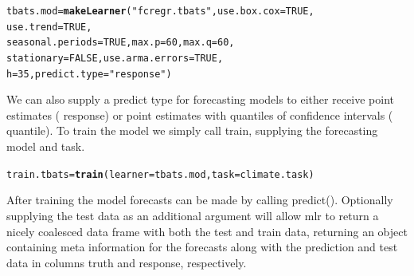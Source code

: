 \documentclass[12pt]{article}\usepackage[]{graphicx}\usepackage[]{color}
\makeatletter
\newcommand{\hlnum}[1]{\textcolor[rgb]{0.686,0.059,0.569}{#1}}%
\newcommand{\hlstr}[1]{\textcolor[rgb]{0.192,0.494,0.8}{#1}}%
\newcommand{\hlstd}[1]{\textcolor[rgb]{0.345,0.345,0.345}{#1}}%
\newcommand{\hlkwb}[1]{\textcolor[rgb]{0.69,0.353,0.396}{#1}}%
\newcommand{\hlkwc}[1]{\textcolor[rgb]{0.333,0.667,0.333}{#1}}%
\newcommand{\hlkwd}[1]{\textcolor[rgb]{0.737,0.353,0.396}{\textbf{#1}}}%
\newenvironment{kframe}{%
 \def\at@end@of@kframe{}%
 \ifinner\ifhmode%
  \def\at@end@of@kframe{\end{minipage}}%
  \begin{minipage}{\columnwidth}%
 \fi\fi%
 \def\FrameCommand##1{\hskip\@totalleftmargin \hskip-\fboxsep
 \colorbox{shadecolor}{##1}\hskip-\fboxsep
     \hskip-\linewidth \hskip-\@totalleftmargin \hskip\columnwidth}%
 \MakeFramed {\advance\hsize-\width
   \@totalleftmargin\z@ \linewidth\hsize
   \@setminipage}}%
 {\par\unskip\endMakeFramed%
 \at@end@of@kframe}
\newenvironment{knitrout}{}{} %
\theoremstyle{definition}
\newcommand\code{\@codex}
\def\@codex#1{{\normalfont\ttfamily\hyphenchar\font=-1 #1}}
\newcommand{\pkg}[1]{{\fontseries{b}\selectfont #1}}
\makeatother
\begin{document}
\singlespacing
\begin{knitrout}
\color{fgcolor}\begin{kframe}
\begin{alltt}
\hlstd{tbats.mod} \hlkwb{=}\hlkwd{makeLearner}\hlstd{(}\hlstr{"fcregr.tbats"}\hlstd{,} \hlkwc{use.box.cox} \hlstd{=} \hlnum{TRUE}\hlstd{,}
                      \hlkwc{use.trend} \hlstd{=} \hlnum{TRUE}\hlstd{,}
                      \hlkwc{seasonal.periods} \hlstd{=} \hlnum{TRUE}\hlstd{,} \hlkwc{max.p} \hlstd{=} \hlnum{60}\hlstd{,} \hlkwc{max.q} \hlstd{=} \hlnum{60}\hlstd{,}
                      \hlkwc{stationary} \hlstd{=} \hlnum{FALSE}\hlstd{,} \hlkwc{use.arma.errors} \hlstd{=} \hlnum{TRUE}\hlstd{,}
                      \hlkwc{h} \hlstd{=} \hlnum{35}\hlstd{,} \hlkwc{predict.type} \hlstd{=} \hlstr{"response"}\hlstd{)}
\end{alltt}
\end{kframe}
\end{knitrout}
\doublespacing

We can also supply a predict type for forecasting models to either receive point estimates (\code{response}) or point estimates with quantiles of confidence intervals (\code{quantile}). To train the model we simply call train, supplying the forecasting model and task.

\singlespace
\begin{knitrout}
\color{fgcolor}\begin{kframe}
\begin{alltt}
\hlstd{train.tbats}\hlkwb{=} \hlkwd{train}\hlstd{(}\hlkwc{learner} \hlstd{= tbats.mod,} \hlkwc{task} \hlstd{= climate.task )}
\end{alltt}
\end{kframe}
\end{knitrout}
\doublespace

After training the model forecasts can be made by calling \code{predict()}. Optionally supplying the test data as an additional argument will allow \pkg{mlr} to return a nicely coalesced data frame with both the test and train data, returning an object containing meta information for the forecasts along with the prediction and test data in columns \code{truth} and \code{response}, respectively.
\end{document}
